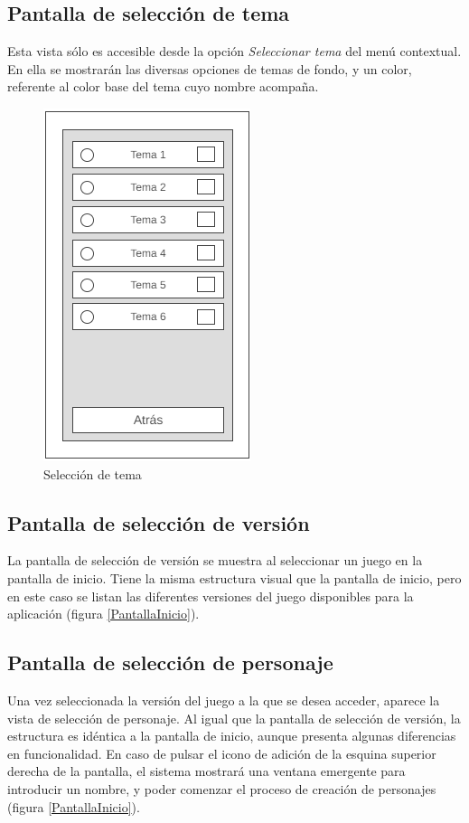 \subsection{Pantalla de selección de tema}
Esta vista sólo es accesible desde la opción \textit{Seleccionar tema} del menú contextual.
En ella se mostrarán las diversas opciones de temas de fondo, y un color, referente al color base del tema cuyo nombre acompaña.

\begin{figure}[H]
    \centering
    \includegraphics[scale=0.3]{Figures/Mockups/Mock_SeleccionTema.png}
    \caption{Selección de tema}
    \label{SeleccionTema}    
\end{figure}

\subsection{Pantalla de selección de versión}
La pantalla de selección de versión se muestra al seleccionar un juego en la pantalla de inicio.
Tiene la misma estructura visual que la pantalla de inicio, pero en este caso se listan las diferentes versiones 
del juego disponibles para la aplicación (figura \ref*{PantallaInicio}).

\subsection{Pantalla de selección de personaje}
Una vez seleccionada la versión del juego a la que se desea acceder, aparece la vista de selección de personaje.
Al igual que la pantalla de selección de versión, la estructura es idéntica a la pantalla de inicio, aunque presenta 
algunas diferencias en funcionalidad. En caso de pulsar el icono de adición de la esquina superior derecha de la pantalla, 
el sistema mostrará una ventana emergente para introducir un nombre, y poder comenzar el proceso de creación de personajes 
(figura \ref*{PantallaInicio}).

